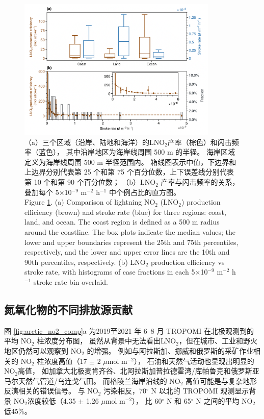 \begin{figure}[H]
\centering
\includegraphics[width=0.85\textwidth]{./figures/arctic_pe_rate.png}
\caption{
（a）三个区域（沿岸、陆地和海洋）的LNO$_2$产率（棕色）和闪击频率（蓝色），
其中沿岸地区为海岸线周围 500 m 的半径。
海岸区域定义为海岸线周围 500 m 半径范围内。
箱线图表示中值，下边界和上边界分别代表第 25 个和第 75 个百分位数，上下误差线分别代表第 10 个和第 90 个百分位数；
（b）LNO$_2$ 产率与闪击频率的关系，叠加每个 5$\times$10$^{-9}$ m$^{-2}$ h$^{-1}$ 中个例占比的直方图。 \\
Figure \ref{fig:arctic_pe_rate}. (a) Comparison of lightning NO$_2$ (LNO$_2$) production efficiency (brown) and stroke rate (blue) for three regions: coast, land, and ocean.
The coast region is defined as a 500 m radius around the coastline.
The box plots indicate the median values; the lower and upper boundaries represent the 25th and 75th percentiles, respectively, and the lower and upper error lines are the 10th and 90th percentiles, respectively.
(b) LNO$_2$ production efficiency vs stroke rate, with histograms of case fractions in each 5$\times$10$^{-9}$ m$^{-2}$ h$^{-1}$ stroke rate bin overlaid.
}
\label{fig:arctic_pe_rate}
\end{figure}


\subsection{氮氧化物的不同排放源贡献}


图 \ref{fig:arctic_no2_comp}a 为2019至2021 年 6--8 月 TROPOMI 在北极观测到的平均 NO$_2$ 柱浓度分布图，
虽然从背景中无法看出LNO$_2$，但在城市、工业和野火地区仍然可以观察到 NO$_2$ 的增强。
例如与阿拉斯加、挪威和俄罗斯的采矿作业相关的 NO$_2$ 柱浓度高值（17 $\pm$ 2 $\mu$mol m$^{-2}$），
石油和天然气活动也显现出明显的NO$_2$高值，
如加拿大北极麦肯齐谷、北阿拉斯加普拉德霍湾/库帕鲁克和俄罗斯亚马尔天然气管道/乌连戈气田\citep{VanDerA.2020}。
而格陵兰海岸沿线的 NO$_2$ 高值可能是与复杂地形反演相关的错误信号\citep{Hachmeister.2022}。
与 NO$_2$ 污染相反，70$^{\circ}$ N 以北的 TROPOMI 观测显示背景 NO$_2$浓度较低（4.35 $\pm$ 1.26 $\mu$mol m$^{-2}$），
比 60$^{\circ}$ N 和 65$^{\circ}$ N 之间的平均 NO$_2$ 低45\%。

